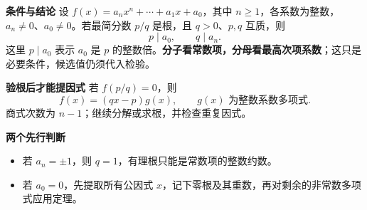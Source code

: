 \begin{statementbox}
\textbf{\textcolor{CStatement}{条件与结论}}
设 $f(x)=a_nx^n+\cdots+a_1x+a_0$，其中 $n\ge1$，各系数为整数，$a_n\ne0$、$a_0\ne0$。若最简分数 $p/q$ 是根，且 $q>0$、$p,q$ 互质，则
\[
  \boxed{p\mid a_0,\qquad q\mid a_n.}
\]
这里 $p\mid a_0$ 表示 $a_0$ 是 $p$ 的整数倍。\textbf{分子看常数项，分母看最高次项系数}；这只是必要条件，候选值仍须代入检验。



\textbf{\textcolor{CStatement}{验根后才能提因式}}
若 $f(p/q)=0$，则
\[
  \boxed{f(x)=(qx-p)g(x),\qquad g(x)\text{ 为整数系数多项式}.}
\]
商式次数为 $n-1$；继续分解或求根，并检查重复因式。

\medskip
\textbf{\textcolor{CStatement}{两个先行判断}}
\begin{itemize}[leftmargin=*,itemsep=0.4em]
\item 若 $a_n=\pm1$，则 $q=1$，有理根只能是常数项的整数约数。
\item 若 $a_0=0$，先提取所有公因式 $x$，记下零根及其重数，再对剩余的非常数多项式应用定理。
\end{itemize}
\end{statementbox}
\clearpage
